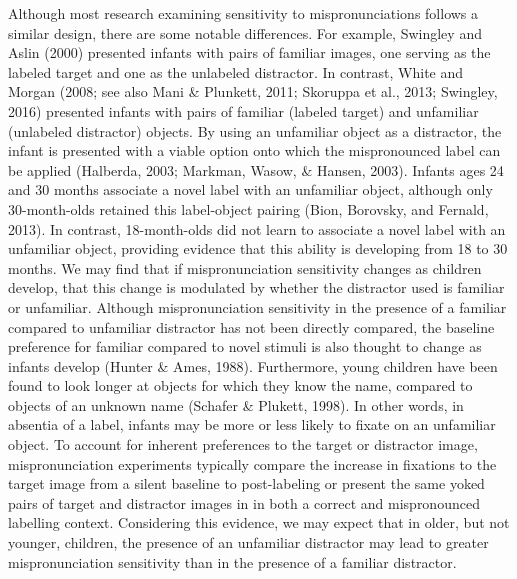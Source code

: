 \documentclass[man]{apa6}
\theoremstyle{definition}
\theoremstyle{definition}
\theoremstyle{definition}
\theoremstyle{remark}
\begin{document}
Although most research examining sensitivity to mispronunciations
follows a similar design, there are some notable differences. For
example, Swingley and Aslin (2000) presented infants with pairs of
familiar images, one serving as the labeled target and one as the
unlabeled distractor. In contrast, White and Morgan (2008; see also Mani
\& Plunkett, 2011; Skoruppa et al., 2013; Swingley, 2016) presented
infants with pairs of familiar (labeled target) and unfamiliar
(unlabeled distractor) objects. By using an unfamiliar object as a
distractor, the infant is presented with a viable option onto which the
mispronounced label can be applied (Halberda, 2003; Markman, Wasow, \&
Hansen, 2003). Infants ages 24 and 30 months associate a novel label
with an unfamiliar object, although only 30-month-olds retained this
label-object pairing (Bion, Borovsky, and Fernald, 2013). In contrast,
18-month-olds did not learn to associate a novel label with an
unfamiliar object, providing evidence that this ability is developing
from 18 to 30 months. We may find that if mispronunciation sensitivity
changes as children develop, that this change is modulated by whether
the distractor used is familiar or unfamiliar. Although mispronunciation
sensitivity in the presence of a familiar compared to unfamiliar
distractor has not been directly compared, the baseline preference for
familiar compared to novel stimuli is also thought to change as infants
develop (Hunter \& Ames, 1988). Furthermore, young children have been
found to look longer at objects for which they know the name, compared
to objects of an unknown name (Schafer \& Plukett, 1998). In other
words, in absentia of a label, infants may be more or less likely to
fixate on an unfamiliar object. To account for inherent preferences to
the target or distractor image, mispronunciation experiments typically
compare the increase in fixations to the target image from a silent
baseline to post-labeling or present the same yoked pairs of target and
distractor images in in both a correct and mispronounced labelling
context. Considering this evidence, we may expect that in older, but not
younger, children, the presence of an unfamiliar distractor may lead to
greater mispronunciation sensitivity than in the presence of a familiar
distractor.
\end{document}
